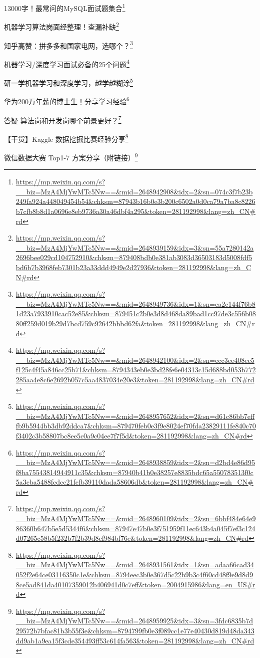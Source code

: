 \documentclass[]{ctexbook}
\renewcommand{\href}[2]{#2\footnote{\url{#1}}}
\begin{document}
\href{https://mp.weixin.qq.com/s?__biz=MzA4MjYwMTc5Nw==\&mid=2648942908\&idx=2\&sn=074c3f7b23b249fa924a448049454b54\&chksm=87943b16b0e3b200c6502a0d0ca79a7ba8c8226b7cfb8b8d1a0696e8eb9736a30a46dbf4a295\&token=281192998\&lang=zh_CN\#rd}{13000字！最常问的MySQL面试题集合}

\href{https://mp.weixin.qq.com/s?__biz=MzA4MjYwMTc5Nw==\&mid=2648939159\&idx=3\&sn=55a7280142a2696bee029cd104752910\&chksm=879408bdb0e381ab3083d36503183d5008fdf5bd6b7b3968feb7301b23a33ddd4949e2d27936\&token=281192998\&lang=zh_CN\#rd}{机器学习算法岗面经整理！查漏补缺}

\href{https://mp.weixin.qq.com/s?__biz=MzA4MjYwMTc5Nw==\&mid=2648949736\&idx=1\&sn=ea2c144f76b81d23a7933910cac52e85\&chksm=879451c2b0e3d8d468da89bad1cc97de3c556b0880ff259d019b29d7bcd759c92642bbbd62fa\&token=281192998\&lang=zh_CN\#rd}{知乎高赞：拼多多和国家电网，选哪个？}

\href{https://mp.weixin.qq.com/s?__biz=MzA4MjYwMTc5Nw==\&mid=2648942100\&idx=2\&sn=ecc3ee408ec5f125c4f45a846cc25b71\&chksm=8794343eb0e3bd28fe6e04313c15d688bd053b772285aa4e8c6e2692b057c5aa4837034e20e3\&token=281192998\&lang=zh_CN\#rd}{机器学习/深度学习面试必备的25个问题}

\href{https://mp.weixin.qq.com/s?__biz=MzA4MjYwMTc5Nw==\&mid=2648957652\&idx=2\&sn=d61c86bb7efffb9b5944bb3db92ddca7\&chksm=879470feb0e3f9e8024ef70fda23829111fe840c70f3402c3b58807bc8ee5c0a9c04ee7f7f5d\&token=281192998\&lang=zh_CN\#rd}{研一学机器学习和深度学习，越学越糊涂}

\href{https://mp.weixin.qq.com/s?__biz=MzA4MjYwMTc5Nw==\&mid=2648938859\&idx=2\&sn=d2bd4e86d95f8ba75543814944911c35\&chksm=87940b41b0e38257e8835bdc65a550783513f0c5a3cba5488fcdcc21fcfb39110dada58606db\&token=281192998\&lang=zh_CN\#rd}{华为200万年薪的博士生！分享学习经验}

\href{https://mp.weixin.qq.com/s?__biz=MzA4MjYwMTc5Nw==\&mid=2648960109\&idx=2\&sn=6bbf484e64e986360b647b5e5d5344f6\&chksm=87947e47b0e3f751959f11ec643b4a045f7ef3c124d07265c58b5f232b7f2b39d8ef984bf76e\&token=281192998\&lang=zh_CN\#rd}{答疑 \textbar{} 算法岗和开发岗哪个前景更好？}

\href{https://mp.weixin.qq.com/s?__biz=MzA4MjYwMTc5Nw==\&mid=2648931561\&idx=1\&sn=adaa66cad34052f2e64ce03116350c1e\&chksm=8794eec3b0e367d5c22b9b3c4f60cd48f9e9d8d98ce5ad841da40107359012b406941d0c7eff\&token=2004915986\&lang=en_US\#rd}{【干货】Kaggle 数据挖掘比赛经验分享}

\href{https://mp.weixin.qq.com/s?__biz=MzA4MjYwMTc5Nw==\&mid=2648959925\&idx=3\&sn=3fdc6835b7d29572b7bfac81b3b55f3e\&chksm=8794799fb0e3f089cc1e77e40430d819d48da343dd9ab1a9ea15f3cde354493ff53c614fa563\&token=281192998\&lang=zh_CN\#rd}{微信数据大赛 Top1-7 方案分享（附链接）}
\end{document}
